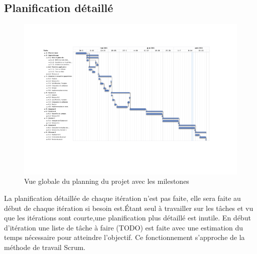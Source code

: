 	 \begin{landscape}
	 	 \subsection{Planification détaillé}
		 \begin{figure}[H]
			 \begin{center}	
				 \includegraphics[height=0.8\textwidth]{../comon/figures/planningV3.pdf}
				 \end{center}			
				 \caption{Vue globale du planning du projet avec les milestones}			
				 \label{planV1}			
		 \end{figure}	
	 \end{landscape}
	 La planification détaillée de chaque itération n'est pas  faite, elle sera faite au début de chaque itération si besoin est.Étant seul à travailler sur les tâches et vu que les itérations sont courte,une planification plus détaillé est inutile. En début d'itération une liste de tâche à faire (TODO) est faite avec une estimation du temps nécessaire pour atteindre l'objectif. Ce fonctionnement s'approche de la méthode de travail Scrum.
	  
